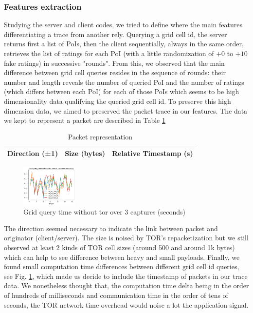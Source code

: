 \documentclass[10pt,conference,compsocconf]{IEEEtran}
\begin{document}
\subsubsection{Features extraction}
Studying the server and client codes, we tried to define where the main features differentiating a trace from another rely. Querying a grid cell id, the server returns first a list of PoIs, then the client sequentially, always in the same order, retrieves the list of ratings for each PoI (with a little randomization of $+0$ to $+10$ fake ratings) in successive "rounds". From this, we observed that the main difference between grid cell queries resides in the sequence of rounds: their number and length reveals the number of queried PoI and the number of ratings (which differs between each PoI) for each of those PoIs which seems to be high dimensionality data qualifying the queried grid cell id. To preserve this high dimension data, we aimed to preserved the packet trace in our features. The data we kept to represent a packet are described in Table \ref{tab:packet_repr}
\begin{table}[h!]
\begin{center}
\begin{tabular}{||c c c||} 
 \hline
 Direction (±1) & Size (bytes) &  Relative Timestamp (s)\\
 \hline
\end{tabular}
\end{center}
\caption{\label{tab:packet_repr}Packet representation}
\end{table}

\begin{figure}
    \centering
    \includegraphics[width=0.25\textwidth]{output.png}
    \caption{Grid query time without tor over 3 captures (seconds)}
    \label{fig:grid_query_no_tor}
\end{figure}
The direction seemed necessary to indicate the link between packet and originator (client/server). The size is noised by TOR's repacketization \cite{noauthor_tor-spectxt_nodate} but we still observed at least 2 kinds of TOR cell sizes (around 500 and around 1k bytes) which can help to see difference between heavy and small payloads. Finally, we found small computation time differences between different grid cell id queries, see Fig. \ref{fig:grid_query_no_tor}, which made us decide to include the timestamp of packets in our trace data. We nonetheless thought that, the computation time delta being in the order of hundreds of milliseconds and communication time in the order of tens of seconds, the TOR network time overhead would noise a lot the application signal.
\end{document}
